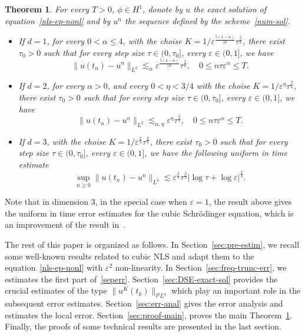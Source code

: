 \documentclass[10pt,a4paper]{article}
\newtheorem{theorem}{Theorem}[section]
\begin{document}
  \begin{theorem}\label{main}
    For every \( T > 0 \), \( \phi \in H^1 \), donote by \(u\) the exact solution
    of equation~\eqref{nls-ep-nonl} and by \(u^n\) the sequence defined by the 
    scheme~\eqref{num-sol}.
    \begin{itemize}
      \item If \(d=1\), for every \(0 < \alpha \leq 4\), with the choise 
        \(K=1/\varepsilon^\frac{5(4-\alpha)}{18}\tau^\frac56\), there exist \(\tau_0 > 0\) 
        such that for every step size \(\tau \in (0,\tau_0]\), every 
        \( \varepsilon \in (0,1] \), we have 
        \[ \|u(t_n)-u^n\|_{L^2} \lesssim_\alpha \varepsilon^\frac{5(4-\alpha)}{18}\tau^\frac56, \quad 
        0 \leq n\tau\varepsilon^\alpha \leq T. \]
      \item If \(d=2\), for every \(\alpha > 0\), and every \(0 < \eta < 3/4\) with 
        the choise \(K=1/\varepsilon^\eta\tau^\frac34\), there exist \(\tau_0 > 0\) 
        such that for every step size \(\tau \in (0,\tau_0]\), every 
        \( \varepsilon \in (0,1] \), we have
        \[ \|u(t_n)-u^n\|_{L^2} \lesssim_{\alpha,\eta} \varepsilon^\eta \tau^\frac34, \quad 
        0 \leq n\tau\varepsilon^\alpha \leq T. \]
      \item If \(d=3\), with the choise \(K=1/\varepsilon^\frac23\tau^\frac23\), 
        there exist \(\tau_0 > 0\) 
        such that for every step size \(\tau \in (0,\tau_0]\), every 
        \( \varepsilon \in (0,1] \), 
        we have the following uniform in time estimate
        \[ \sup_{n \geq 0} \|u(t_n)-u^n\|_{L^2} \lesssim \varepsilon^\frac23 
        \tau^\frac23|\log\tau+\log\varepsilon|^\frac23. \]
    \end{itemize}
  \end{theorem}

  Note that in dimension \(3\), in the special case when \(\varepsilon=1\), the
  result above gives the uniform in time error estimates for the cubic
  Schr\"odinger equation, which is an improvement of the result in~\cite{ORS21}.

  The rest of this paper is organized as follows. In
  Section~\ref{sec:pre-estim}, we recall some well-known results related to
  cubic NLS and adapt them to the equation~\eqref{nls-ep-nonl} with
  \(\varepsilon^2\) non-linearity. In Section~\ref{sec:freq-trunc-err}, we estimates 
  the first part of~\eqref{seperr}. Section~\ref{sec:DSE-exact-sol}
  provides the crucial estimates of the type \(\|u^K(t_k)\|_{l^p L^q}\) which play an
  important role in the subsequent error estimates. Section~\ref{sec:err-anal}
  gives the error analysis and estimates the local error. Section~\ref{sec:proof-main},
  proves the main Theorem~\ref{main}. Finally, the proofs of  some technical 
  results are presented in the last section.
\end{document}
